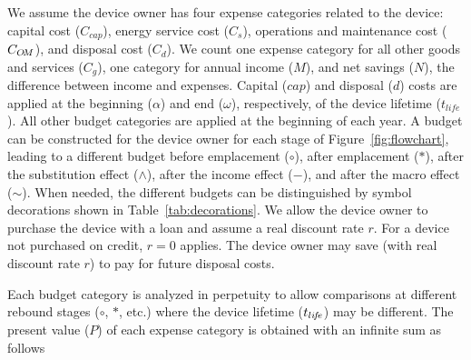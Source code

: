 
We assume the device owner has four expense categories 
related to the device:
capital cost ($C_{cap}$), 
energy service cost ($C_s$), 
operations and maintenance cost ($C_{O\!M}$), and
disposal cost ($C_d$).
We count one expense category for all other
goods and services ($C_g$),
one category for annual income ($M$), and 
net savings ($N$), 
the difference between income and expenses.
Capital ($cap$) and disposal ($d$) costs are applied
at the beginning ($\alpha$) and end ($\omega$), respectively, 
of the device lifetime ($t_{life}$).
All other budget categories are 
applied at the beginning of each year.
A budget can be constructed for the device owner for each stage
of Figure~\ref{fig:flowchart}, 
leading to a different budget 
before emplacement ($\circ$), 
after emplacement ($*$), 
after the substitution effect ($\wedge$), 
after the income effect ($-$), and 
after the macro effect ($\sim$).
When needed, 
the different budgets can be distinguished by symbol decorations
shown in Table~\ref{tab:decorations}.
We allow the device owner to purchase the device 
with a loan and assume a real discount rate $r$.
For a device not purchased on credit,
$r = 0$ applies.
The device owner may save (with real discount rate $r$)
to pay for future disposal costs.

Each budget category is analyzed in perpetuity
to allow comparisons at different rebound stages 
($\circ$, $*$, etc.)
where the device lifetime ($t_{li\!f\!e}$) may be different.
The present value ($P$) of each expense category is obtained
with an infinite sum as follows


